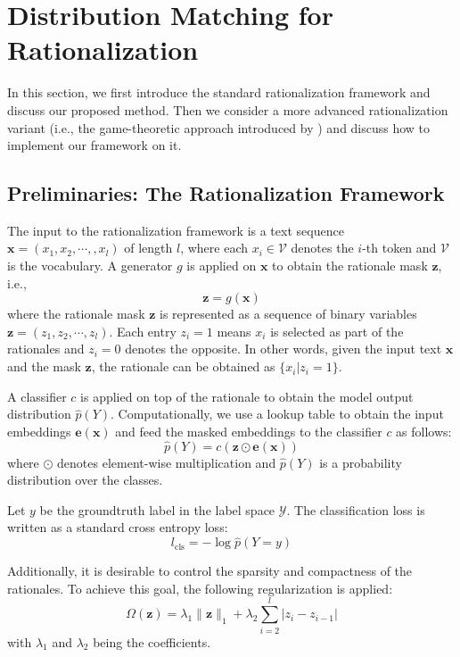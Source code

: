 \documentclass[letterpaper]{article} %
\begin{document}
\section{Distribution Matching for Rationalization}

In this section, we first introduce the standard rationalization framework \cite{lei2016rationalizing} and discuss our proposed method. Then we consider a more advanced rationalization variant (i.e., the game-theoretic approach introduced by \citet{chang2019game}) and discuss how to implement our framework on it.

\subsection{Preliminaries: The Rationalization Framework}

The input to the rationalization framework \cite{lei2016rationalizing} is a text sequence $\mathbf{x}=(x_1, x_2, \cdots, ,x_l)$ of length $l$, where each $x_i \in \mathcal{V}$ denotes the $i$-th token and $\mathcal{V}$ is the vocabulary. A generator $g$ is applied on $\mathbf{x}$ to obtain the rationale mask $\mathbf{z}$, i.e.,
\[
\mathbf{z} = g(\mathbf{x})
\]
where the rationale mask $\mathbf{z}$ is represented as a sequence of binary variables $\mathbf{z} = (z_1, z_2, \cdots, z_l)$. Each entry $z_i = 1$ means $x_i$ is selected as part of the rationales and $z_i = 0$ denotes the opposite. In other words, given the input text $\mathbf{x}$ and the mask $\mathbf{z}$, the rationale can be obtained as $\{x_i | z_i = 1\}$.

A classifier $c$ is applied on top of the rationale to obtain the model output distribution $\hat{p}(Y)$. Computationally, we use a lookup table to obtain the input embeddings $\mathbf{e}(\mathbf{x})$ and feed the masked embeddings to the classifier $c$ as follows:
\[
\hat{p}(Y) = c(\mathbf{z} \odot \mathbf{e}(\mathbf{x}))
\]
where $\odot$ denotes element-wise multiplication and $\hat{p}(Y)$ is a probability distribution over the classes.

Let $y$ be the groundtruth label in the label space $\mathcal{Y}$. The classification loss is written as a standard cross entropy loss:
\[
l_\text{cls} = - \log \hat{p}(Y = y)
\]

Additionally, it is desirable to control the sparsity and compactness of the rationales. To achieve this goal, the following regularization is applied:
\[
\Omega(\mathbf{z}) = \lambda_1 \|\mathbf{z}\|_1 + \lambda_2 \sum_{i = 2}^{l}|z_i - z_{i - 1}|
\]
with $\lambda_1$ and $\lambda_2$ being the coefficients.
\end{document}
